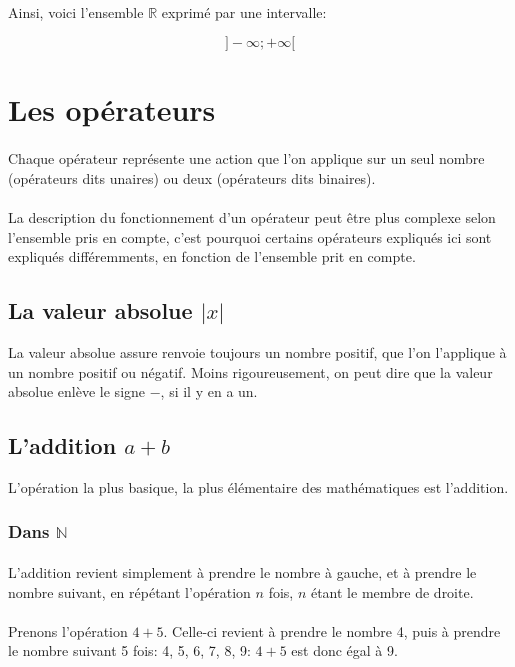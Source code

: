 \documentclass[a4paper]{book}
\begin{document}
    
    \paragraph{}
    Ainsi, voici l'ensemble $\mathds{R}$ exprimé par une intervalle:
    
    $$]-\infty; +\infty[$$
    
    \section{Les opérateurs}
    \paragraph{}
    Chaque opérateur représente une action que l'on applique sur un seul nombre (opérateurs dits unaires) ou deux (opérateurs dits binaires).
    \paragraph{}
    La description du fonctionnement d'un opérateur peut être plus complexe selon l'ensemble pris en compte, c'est pourquoi certains opérateurs expliqués ici sont expliqués différemments, en fonction de l'ensemble prit en compte.
    \subsection{La valeur absolue $|x|$}
    La valeur absolue assure renvoie toujours un nombre positif, que l'on l'applique à un nombre positif ou négatif. Moins rigoureusement, on peut dire que la valeur absolue enlève le signe $-$, si il y en a un.
    \label{sec:math--obj--op--add}
    \subsection{L'addition $a + b$}
    L'opération la plus basique, la plus élémentaire des mathématiques est l'addition.
    \subsubsection{Dans $\mathds{N}$}
    \paragraph{}
    L'addition revient simplement à prendre le nombre à gauche, et à prendre le nombre suivant, en répétant l'opération $n$ fois, $n$ étant le membre de droite.
    \paragraph{}
    Prenons l'opération $4 + 5$.
    Celle-ci revient à prendre le nombre 4, puis à prendre le nombre suivant 5 fois: 4, 5, 6, 7, 8, 9: $4 + 5$ est donc égal à 9.
\end{document}
